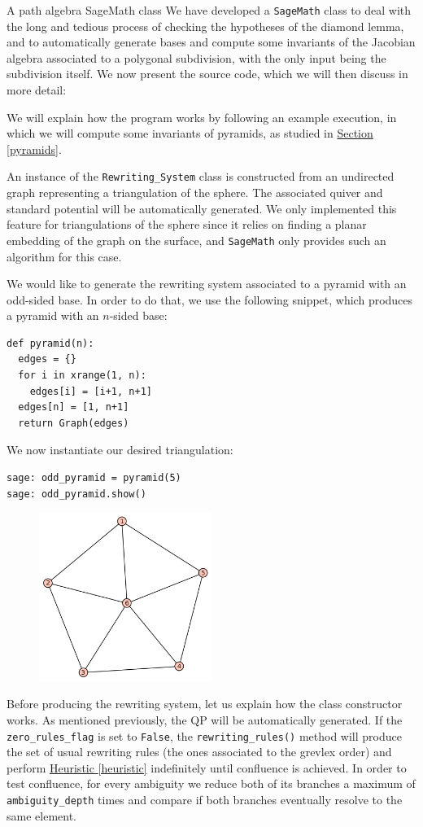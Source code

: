 \begin{chapter}{A path algebra SageMath class}
\label{appendix}
We have developed a \texttt{SageMath} class to deal with the long and tedious process of checking the hypotheses of the diamond lemma, and to automatically generate bases and compute some invariants of the Jacobian algebra associated to a polygonal subdivision, with the only input being the subdivision itself. We now present the source code, which we will then discuss in more detail:

We will explain how the program works by following an example execution, in which we will compute some invariants of pyramids, as studied in \hyperref[pyramids]{Section \ref*{pyramids}}.

An instance of the \texttt{Rewriting\_System} class is constructed from an undirected graph representing a triangulation of the sphere. The associated quiver and standard potential will be automatically generated. We only implemented this feature for triangulations of the sphere since it relies on finding a planar embedding of the graph on the surface, and \texttt{SageMath} only provides such an algorithm for this case.

We would like to generate the rewriting system associated to a pyramid with an odd-sided base. In order to do that, we use the following snippet, which produces a pyramid with an $n$-sided base:
\begin{lstlisting}
def pyramid(n):
  edges = {}
  for i in xrange(1, n):
    edges[i] = [i+1, n+1]
  edges[n] = [1, n+1]
  return Graph(edges)
\end{lstlisting}
We now instantiate our desired triangulation:
\begin{lstlisting}
sage: odd_pyramid = pyramid(5)
sage: odd_pyramid.show()
\end{lstlisting}
\begin{figure}[h]
\centering
\includegraphics[width=0.5\textwidth]{odd_pyramid.png}
\end{figure}
Before producing the rewriting system, let us explain how the class constructor works. As mentioned previously, the QP will be automatically generated. If the \texttt{zero\_rules\_flag} is set to \texttt{False}, the \texttt{rewriting\_rules()} method will produce the set of usual rewriting rules (the ones associated to the grevlex order) and perform \hyperref[heuristic]{Heuristic \ref*{heuristic}} indefinitely until confluence is achieved. In order to test confluence, for every ambiguity we reduce both of its branches a maximum of \texttt{ambiguity\_depth} times and compare if both branches eventually resolve to the same element.


\end{chapter}
